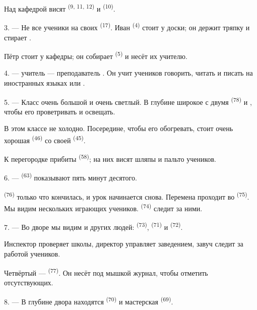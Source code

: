 Над кафедрой висят  \textsuperscript{(9, 11, 12)} и
 \textsuperscript{(10)}.

3. --- Не все ученики на своих  \textsuperscript{(17)}. Иван
\textsuperscript{(4)} стоит у доски; он держит тряпку и стирает
.

Пётр стоит у кафедры; он собирает 
\textsuperscript{(5)} и несёт их учителю.

4. ---  учитель --- преподаватель . Он
учит учеников говорить, читать и писать на иностранных языках
 или
.

5. --- Класс очень большой и очень светлый. В глубине широкое
 с двумя  \textsuperscript{(78)} и , чтобы его проветривать и освещать.

В этом классе не холодно. Посередине, чтобы его обогревать, стоит очень
хорошая  \textsuperscript{(46)} со своей 
\textsuperscript{(45)}.

К перегородке прибиты  \textsuperscript{(58)}; на них висят
шляпы и пальто учеников.

\VUsaut{5.2mm}
\VUsaut{3.6mm}

6. ---  \textsuperscript{(63)} показывают пять минут десятого.

 \textsuperscript{(76)} только что кончилась, и урок начинается
снова. Перемена проходит во  \textsuperscript{(75)}. Мы видим
нескольких играющих учеников.  \textsuperscript{(74)} следит
за ними.

7. --- Во дворе мы видим и других людей: 
\textsuperscript{(73)},  \textsuperscript{(71)} и 
\textsuperscript{(72)}.

Инспектор проверяет школы, директор управляет заведением, завуч следит
за работой учеников.

Четвёртый ---  \textsuperscript{(77)}. Он несёт под мышкой журнал,
чтобы отметить отсутствующих.

8. --- В глубине двора находятся 
\textsuperscript{(70)} и мастерская  \textsuperscript{(69)}.

